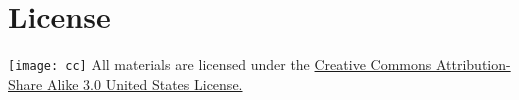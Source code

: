 

\chapter*{License}


\noindent
\texttt{[image: cc]} All materials are licensed under the \href{http://creativecommons.org/licenses/by-sa/3.0/us/}{Creative Commons Attribution-Share Alike 3.0 United States License.}
